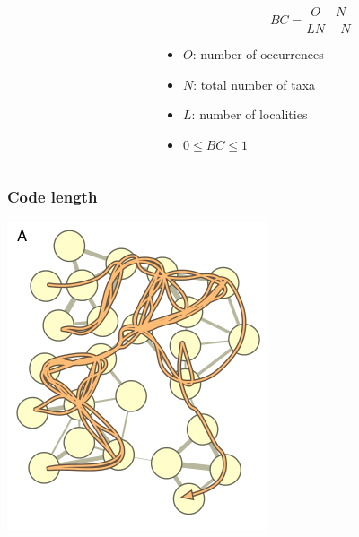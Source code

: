 \documentclass{beamer}
\begin{document}
\begin{frame}
\begin{columns}
\begin{column}{0.5\textwidth}
\begin{center}
        \tiny{}
      \end{center}
    \end{column}
    \begin{column}{0.5\textwidth}
      \[
        BC = \frac{O - N}{LN - N}
      \]

      \begin{itemize}
        \item \(O\): number of occurrences
        \item \(N\): total number of taxa
        \item \(L\): number of localities
        \item \(0 \leq BC \leq 1\)
      \end{itemize}
    \end{column}
  \end{columns}
\end{frame}

\begin{frame}
  \frametitle{Code length}
  \begin{center}
    \includegraphics[height=0.8\textheight,width=\textwidth,keepaspectratio=true]{figure/map1}

    \tiny{}
  \end{center}
\end{frame}
\end{document}
